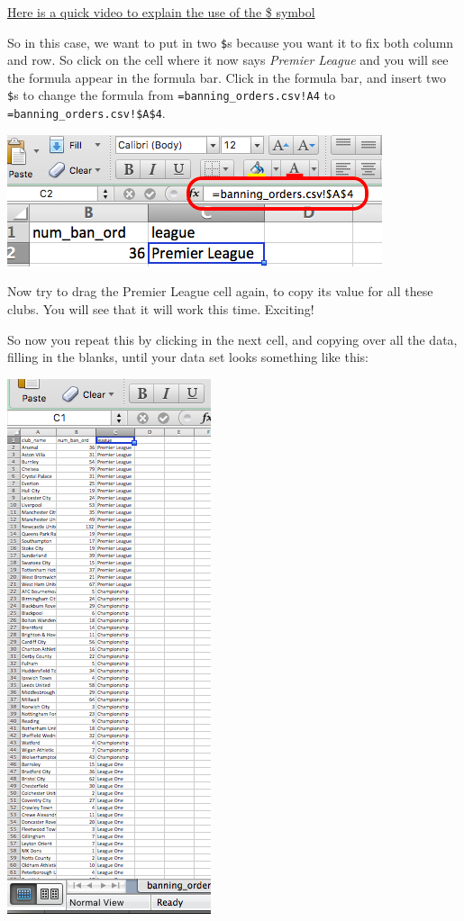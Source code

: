 \documentclass[]{book}
\theoremstyle{definition}
\theoremstyle{definition}
\theoremstyle{definition}
\theoremstyle{remark}
\begin{document}
\href{https://www.youtube.com/watch?v=b3i6AgMEssI}{Here is a quick video
to explain the use of the \$ symbol}

So in this case, we want to put in two \texttt{\$}s because you want it
to fix both column and row. So click on the cell where it now says
\emph{Premier League} and you will see the formula appear in the formula
bar. Click in the formula bar, and insert two \texttt{\$}s to change the
formula from \texttt{=banning\_orders.csv!A4} to
\texttt{=banning\_orders.csv!\$A\$4}.

\includegraphics{imgs/formula_bar.png}

Now try to drag the Premier League cell again, to copy its value for all
these clubs. You will see that it will work this time. Exciting!

So now you repeat this by clicking in the next cell, and copying over
all the data, filling in the blanks, until your data set looks something
like this:

\includegraphics{imgs/fbo_overview.png}
\end{document}
